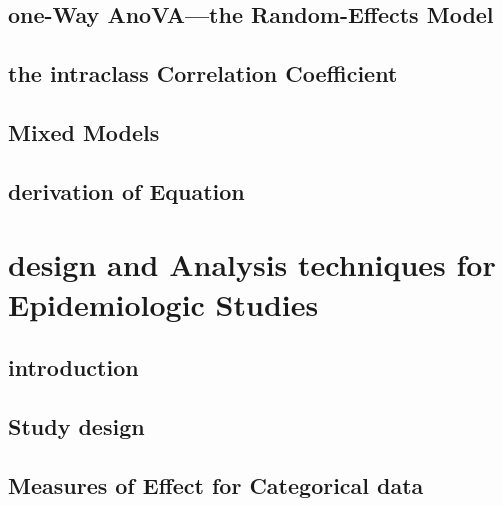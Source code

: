 \documentclass[12pt,]{article}
\begin{document}
\hypertarget{one-way-anovathe-random-effects-model}{%
\subsection{one-Way AnoVA---the Random-Effects
Model}\label{one-way-anovathe-random-effects-model}}

\hypertarget{the-intraclass-correlation-coefficient}{%
\subsection{the intraclass Correlation
Coefficient}\label{the-intraclass-correlation-coefficient}}

\hypertarget{mixed-models}{%
\subsection{Mixed Models}\label{mixed-models}}

\hypertarget{derivation-of-equation}{%
\subsection{derivation of Equation}\label{derivation-of-equation}}

\hypertarget{design-and-analysis-techniques-for-epidemiologic-studies}{%
\section{design and Analysis techniques for Epidemiologic
Studies}\label{design-and-analysis-techniques-for-epidemiologic-studies}}

\hypertarget{introduction-8}{%
\subsection{introduction}\label{introduction-8}}

\hypertarget{study-design}{%
\subsection{Study design}\label{study-design}}

\hypertarget{measures-of-effect-for-categorical-data}{%
\subsection{Measures of Effect for Categorical
data}\label{measures-of-effect-for-categorical-data}}
\end{document}
